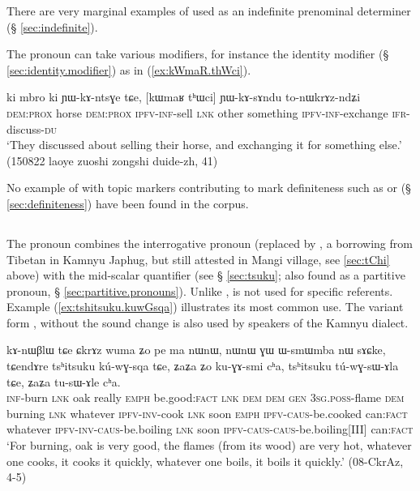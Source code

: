  There are very marginal examples of  used as an indefinite prenominal determiner (§ \ref{sec:indefinite}).

The pronoun  can take various modifiers, for instance the identity modifier  (§ \ref{sec:identity.modifier})  as in (\ref{ex:kWmaR.thWci}). 
 
\begin{exe}
\ex \label{ex:kWmaR.thWci}
\gll    ki mbro ki ɲɯ-kɤ-ntsɣe tɕe, [kɯmaʁ tʰɯci] ɲɯ-kɤ-sɤndu to-nɯkrɤz-ndʑi \\
\textsc{dem:prox} horse \textsc{dem:prox} \textsc{ipfv-inf}-sell \textsc{lnk} other  something   \textsc{ipfv-inf}-exchange \textsc{ifr}-discuss-\textsc{du} \\
 \glt `They discussed about selling their horse, and exchanging it for something else.' (150822 laoye zuoshi zongshi duide-zh, 41)
\end{exe}

No example of  with topic markers contributing to mark definiteness such as  or  (§ \ref{sec:definiteness}) have been found in the corpus.

\subsection{} \label{sec:tshitsuku}
The pronoun  combines the  interrogative pronoun  (replaced by , a borrowing from Tibetan in Kamnyu Japhug, but still attested in Mangi village, see \ref{sec:tChi} above) with the mid-scalar quantifier   (see § \ref{sec:tsuku}; also found as a partitive pronoun, § \ref{sec:partitive.pronouns}).  Unlike  , is not used for specific referents.  Example (\ref{ex:tshitsuku.kuwGsqa}) illustrates its most common use. The variant form , without the sound change  \fl{}  is also used by speakers of the Kamnyu dialect.

\begin{exe}
\ex \label{ex:tshitsuku.kuwGsqa}
\gll  
kɤ-nɯβlɯ tɕe ɕkrɤz wuma ʑo pe ma nɯnɯ, nɯnɯ ɣɯ ɯ-smɯmba nɯ sɤɕke, tɕendɤre tsʰitsuku kú-wɣ-sqa tɕe, ʑaʑa ʑo ku-ɣɤ-smi cʰa, tsʰitsuku tú-wɣ-sɯ-ɤla tɕe, ʑaʑa tu-sɯ-ɤle cʰa. \\
\textsc{inf}-burn \textsc{lnk} oak really \textsc{emph} be.good:\textsc{fact} \textsc{lnk} \textsc{dem} \textsc{dem} \textsc{gen} \textsc{3sg.poss}-flame \textsc{dem} burning \textsc{lnk} whatever \textsc{ipfv-inv}-cook \textsc{lnk} soon \textsc{emph}  \textsc{ipfv-caus}-be.cooked can:\textsc{fact} whatever \textsc{ipfv-inv-caus}-be.boiling \textsc{lnk} soon  \textsc{ipfv-caus-caus}-be.boiling[III] can:\textsc{fact} \\
\glt `For burning, oak is very good, the flames (from its wood) are very hot, whatever one cooks, it cooks it quickly, whatever one boils, it boils it quickly.' (08-CkrAz, 4-5)
\end{exe}
 
